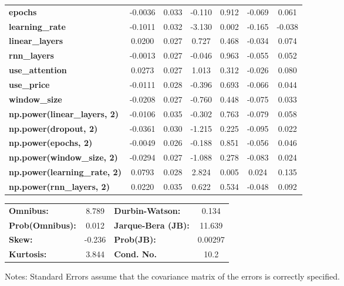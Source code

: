 \begin{center}
\begin{tabular}{lcccccc}
\textbf{epochs}                            &      -0.0036  &        0.033     &    -0.110  &         0.912        &       -0.069    &        0.061     \\
\textbf{learning\_rate}                    &      -0.1011  &        0.032     &    -3.130  &         0.002        &       -0.165    &       -0.038     \\
\textbf{linear\_layers}                    &       0.0200  &        0.027     &     0.727  &         0.468        &       -0.034    &        0.074     \\
\textbf{rnn\_layers}                       &      -0.0013  &        0.027     &    -0.046  &         0.963        &       -0.055    &        0.052     \\
\textbf{use\_attention}                    &       0.0273  &        0.027     &     1.013  &         0.312        &       -0.026    &        0.080     \\
\textbf{use\_price}                        &      -0.0111  &        0.028     &    -0.396  &         0.693        &       -0.066    &        0.044     \\
\textbf{window\_size}                      &      -0.0208  &        0.027     &    -0.760  &         0.448        &       -0.075    &        0.033     \\
\textbf{np.power(linear\_layers, 2)}       &      -0.0106  &        0.035     &    -0.302  &         0.763        &       -0.079    &        0.058     \\
\textbf{np.power(dropout, 2)}              &      -0.0361  &        0.030     &    -1.215  &         0.225        &       -0.095    &        0.022     \\
\textbf{np.power(epochs, 2)}               &      -0.0049  &        0.026     &    -0.188  &         0.851        &       -0.056    &        0.046     \\
\textbf{np.power(window\_size, 2)}         &      -0.0294  &        0.027     &    -1.088  &         0.278        &       -0.083    &        0.024     \\
\textbf{np.power(learning\_rate, 2)}       &       0.0793  &        0.028     &     2.824  &         0.005        &        0.024    &        0.135     \\
\textbf{np.power(rnn\_layers, 2)}          &       0.0220  &        0.035     &     0.622  &         0.534        &       -0.048    &        0.092     \\
\bottomrule
\end{tabular}
\begin{tabular}{lclc}
\textbf{Omnibus:}       &  8.789 & \textbf{  Durbin-Watson:     } &    0.134  \\
\textbf{Prob(Omnibus):} &  0.012 & \textbf{  Jarque-Bera (JB):  } &   11.639  \\
\textbf{Skew:}          & -0.236 & \textbf{  Prob(JB):          } &  0.00297  \\
\textbf{Kurtosis:}      &  3.844 & \textbf{  Cond. No.          } &     10.2  \\
\bottomrule
\end{tabular}
\end{center}

Notes: \newline
 [1] Standard Errors assume that the covariance matrix of the errors is correctly specified.